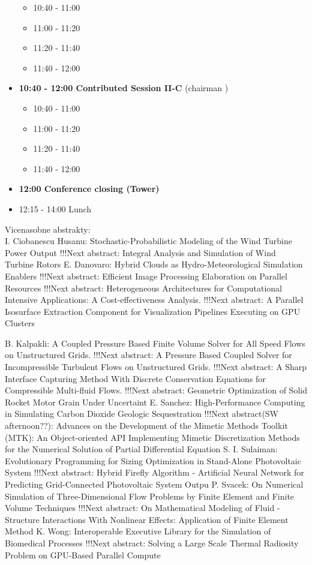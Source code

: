 \documentclass[10pt, A4]{article}%
\begin{document}
\begin{itemize}
  \begin{itemize}
    \item 10:40 - 11:00 
    \item 11:00 - 11:20 
    \item 11:20 - 11:40 
    \item 11:40 - 12:00  
  \end{itemize}
  \item {\bf 10:40 - 12:00 Contributed Session II-C} (chairman ) 
  \begin{itemize}
    \item 10:40 - 11:00 
    \item 11:00 - 11:20 
    \item 11:20 - 11:40 
    \item 11:40 - 12:00 
  \end{itemize}
  \item {\bf 12:00 Conference closing (Tower)}
  \item 12:15 - 14:00 Lunch
\newpage
\end{itemize}



\newpage
Vicenasobne abstrakty:\\
{I. Ciobanescu Husanu}: {Stochastic-Probabilistic Modeling of the Wind Turbine Power Output       !!!Next abstract: Integral Analysis and Simulation of Wind Turbine Rotors}
{E. Danovaro}: {Hybrid Clouds as Hydro-Meteorological Simulation Enablers       !!!Next abstract: Efficient Image Processing Elaboration on Parallel Resources       !!!Next abstract: Heterogeneous Architectures for Computational Intensive Applications: A Cost-effectiveness Analysis.       !!!Next abstract: A Parallel Isosurface Extraction Component for Visualization Pipelines Executing on GPU Clusters}


{B. Kalpakli}: {A Coupled Pressure Based Finite Volume Solver for All Speed Flows on Unstructured Grids.      !!!Next abstract: A Pressure Based Coupled Solver for Incompressible Turbulent Flows on Unstructured Grids.      !!!Next abstract: A Sharp Interface Capturing Method With Discrete Conservation Equations for Compressible Multi-fluid Flows.      !!!Next abstract: Geometric Optimization of Solid Rocket Motor Grain Under Uncertaint}
{E. Sanchez}: {High-Performance Computing in Simulating Carbon Dioxide Geologic Sequestration      !!!Next abstract(SW afternoon??): Advances on the Development of the Mimetic Methods Toolkit (MTK): An Object-oriented API Implementing Mimetic Discretization Methods for the Numerical Solution of Partial Differential Equation}
{S. I. Sulaiman}: {Evolutionary Programming for Sizing Optimization in Stand-Alone Photovoltaic System      !!!Next abstract: Hybrid Firefly Algorithm - Artificial Neural Network for Predicting Grid-Connected Photovoltaic System Outpu}
{P. Svacek}: {On Numerical Simulation of Three-Dimensional Flow Problems by Finite Element and Finite Volume Techniques      !!!Next abstract: On Mathematical Modeling of Fluid - Structure Interactions With Nonlinear Effects: Application of Finite Element Method}
{K. Wong}: {Interoperable Executive Library for the Simulation of Biomedical Processes      !!!Next abstract: Solving a Large Scale Thermal Radiosity Problem on GPU-Based Parallel Compute}
\end{document}
